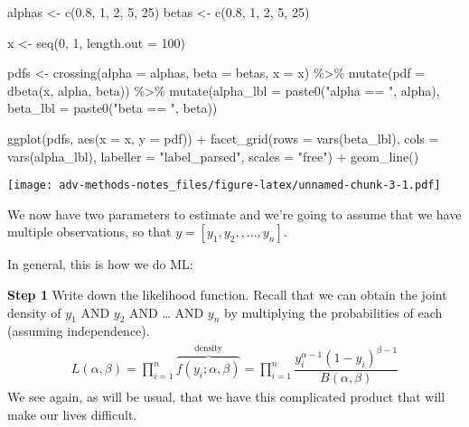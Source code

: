 \documentclass[
]{book}
\newenvironment{Shaded}{\begin{snugshade}}{\end{snugshade}}
\newcommand{\AttributeTok}[1]{\textcolor[rgb]{0.77,0.63,0.00}{#1}}
\newcommand{\DecValTok}[1]{\textcolor[rgb]{0.00,0.00,0.81}{#1}}
\newcommand{\FloatTok}[1]{\textcolor[rgb]{0.00,0.00,0.81}{#1}}
\newcommand{\FunctionTok}[1]{\textcolor[rgb]{0.00,0.00,0.00}{#1}}
\newcommand{\NormalTok}[1]{#1}
\newcommand{\OtherTok}[1]{\textcolor[rgb]{0.56,0.35,0.01}{#1}}
\newcommand{\SpecialCharTok}[1]{\textcolor[rgb]{0.00,0.00,0.00}{#1}}
\newcommand{\StringTok}[1]{\textcolor[rgb]{0.31,0.60,0.02}{#1}}
\begin{document}
\begin{Shaded}
\begin{Highlighting}[]
\NormalTok{alphas }\OtherTok{\textless{}{-}} \FunctionTok{c}\NormalTok{(}\FloatTok{0.8}\NormalTok{, }\DecValTok{1}\NormalTok{, }\DecValTok{2}\NormalTok{, }\DecValTok{5}\NormalTok{, }\DecValTok{25}\NormalTok{)}
\NormalTok{betas }\OtherTok{\textless{}{-}} \FunctionTok{c}\NormalTok{(}\FloatTok{0.8}\NormalTok{, }\DecValTok{1}\NormalTok{, }\DecValTok{2}\NormalTok{, }\DecValTok{5}\NormalTok{, }\DecValTok{25}\NormalTok{)}

\NormalTok{x }\OtherTok{\textless{}{-}} \FunctionTok{seq}\NormalTok{(}\DecValTok{0}\NormalTok{, }\DecValTok{1}\NormalTok{, }\AttributeTok{length.out =} \DecValTok{100}\NormalTok{)}

\NormalTok{pdfs }\OtherTok{\textless{}{-}} \FunctionTok{crossing}\NormalTok{(}\AttributeTok{alpha =}\NormalTok{ alphas, }
                 \AttributeTok{beta =}\NormalTok{ betas, }
                 \AttributeTok{x =}\NormalTok{ x) }\SpecialCharTok{\%\textgreater{}\%}
  \FunctionTok{mutate}\NormalTok{(}\AttributeTok{pdf =} \FunctionTok{dbeta}\NormalTok{(x, alpha, beta)) }\SpecialCharTok{\%\textgreater{}\%}
  \FunctionTok{mutate}\NormalTok{(}\AttributeTok{alpha\_lbl =} \FunctionTok{paste0}\NormalTok{(}\StringTok{"alpha == "}\NormalTok{, alpha),}
         \AttributeTok{beta\_lbl =} \FunctionTok{paste0}\NormalTok{(}\StringTok{"beta == "}\NormalTok{, beta)) }

\FunctionTok{ggplot}\NormalTok{(pdfs, }\FunctionTok{aes}\NormalTok{(}\AttributeTok{x =}\NormalTok{ x, }\AttributeTok{y =}\NormalTok{ pdf)) }\SpecialCharTok{+} 
  \FunctionTok{facet\_grid}\NormalTok{(}\AttributeTok{rows =} \FunctionTok{vars}\NormalTok{(beta\_lbl), }\AttributeTok{cols =} \FunctionTok{vars}\NormalTok{(alpha\_lbl), }
             \AttributeTok{labeller =} \StringTok{"label\_parsed"}\NormalTok{, }\AttributeTok{scales =} \StringTok{"free"}\NormalTok{) }\SpecialCharTok{+} 
  \FunctionTok{geom\_line}\NormalTok{()}
\end{Highlighting}
\end{Shaded}

\texttt{[image: adv-methods-notes\_files/figure-latex/unnamed-chunk-3-1.pdf]}

We now have two parameters to estimate and we're going to assume that we
have multiple observations, so that \(y = [y_1, y_2, ,..., y_n]\).

In general, this is how we do ML:

\textbf{Step 1} Write down the likelihood function. Recall that we can
obtain the joint density of \(y_1\) AND \(y_2\) AND \ldots{} AND \(y_n\)
by multiplying the probabilities of each (assuming independence). \[
\begin{aligned}
L(\alpha, \beta) = \displaystyle\prod_{i = 1}^n \overbrace{f(y_i;\alpha, \beta)}^{\text{density}} = \displaystyle\prod_{i = 1}^n \dfrac{y_i^{\alpha - 1}(1 - y_i)^{\beta - 1}}{B(\alpha, \beta)}
\end{aligned}
\] We see again, as will be usual, that we have this complicated product
that will make our lives difficult.
\end{document}
